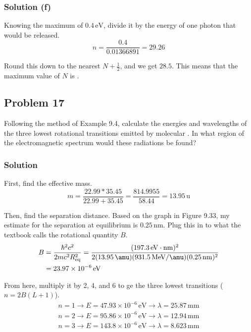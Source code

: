 \documentclass[12pt]{article}
\newcommand{\E}[1]{\times 10^{#1}}
\begin{document}
        \subsubsection{Solution (f)}
            Knowing the maximum of $0.4\,\unit{\eV}$, divide it by the energy of one photon that would be released.
            \begin{equation}
                n   =   \frac{0.4}{0.01366891}
                    =   29.26
            \end{equation}

            Round this down to the nearest $N + \frac{1}{2}$, and we get $28.5$.
            This means that the maximum value of $N$ is .
            
        
    \pagebreak
    \subsection{Problem 17}
        Following the method of Example 9.4, calculate the energies and wavelengths of the three lowest rotational transitions emitted by molecular . 
        In what region of the electromagnetic spectrum would these radiations be found?

        \subsubsection{Solution}
            First, find the effective mass.
            \begin{equation}
                m   =   \frac{22.99 * 35.45}{22.99 + 35.45}
                    =   \frac{814.9955}{58.44}
                    =   13.95\,\unit{\amu}
            \end{equation}

            Then, find the separation distance.
            Based on the graph in Figure 9.33, my estimate for the separation at equilibrium is $0.25\,\unit{\nano\meter}$.
            Plug this in to what the textbook calls the rotational quantity $B$.
            \begin{align}
                B   &=  \frac{\hbar^2 c^2}{2mc^2R_{\rm eq}^2}
                    =   \frac{(197.3\,\unit{\eV\cdot\nano\meter})^2}{2(13.95\,\unit{\amu})(931.5\,\unit{\mega\eV/\amu})(0.25\,\unit{\nano\meter})^2}\\
                    &=  23.97\E{-6}\,\unit{\eV}
            \end{align}

            From here, multiply it by 2, 4, and 6 to ge the three lowest transitions ($n = 2B(L+1)$).
            \begin{align}
                n = 1 \to E = 47.93\E{-6}\,\unit{\eV} \to \lambda = 25.87\,\unit{\milli\meter}\\
                n = 2 \to E = 95.86\E{-6}\,\unit{\eV} \to \lambda = 12.94\,\unit{\milli\meter}\\
                n = 3 \to E = 143.8\E{-6}\,\unit{\eV} \to \lambda = 8.623\,\unit{\milli\meter}
            \end{align}
\end{document}
